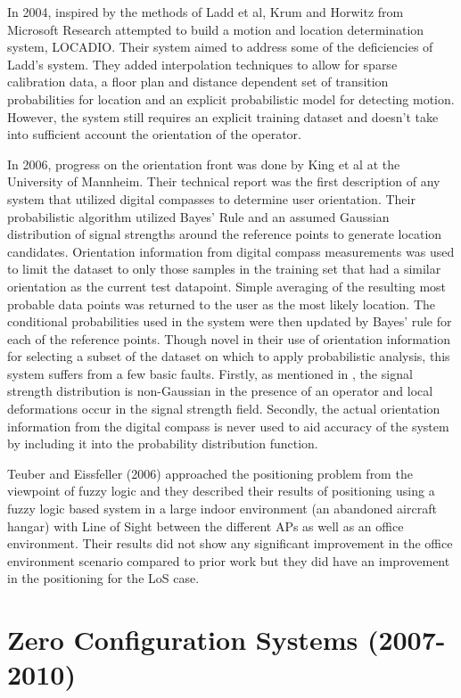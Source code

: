 In 2004, inspired by the methods of Ladd et al, Krum and Horwitz from Microsoft Research attempted to build a motion and location determination system, LOCADIO. Their system aimed to address some of the deficiencies of Ladd’s system. They added interpolation techniques to allow for sparse calibration data, a floor plan and distance dependent set of transition probabilities for location and an explicit probabilistic model for detecting motion. However, the system still requires an explicit training dataset and doesn’t take into sufficient account the orientation of the operator.

In 2006, progress on the orientation front was done by King et al at the University of Mannheim. Their technical report was the first description of any system that utilized digital compasses to determine user orientation. Their probabilistic algorithm utilized Bayes’ Rule and an assumed Gaussian distribution of signal strengths around the reference points to generate location candidates. Orientation information from digital compass measurements was used to limit the dataset to only those samples in the training set that had a similar orientation as the current test datapoint. Simple averaging of the resulting most probable data points was returned to the user as the most likely location. The conditional probabilities used in the system were then updated by Bayes’ rule for each of the reference points. Though novel in their use of orientation information for selecting a subset of the dataset on which to apply probabilistic analysis, this system suffers from a few basic faults. Firstly, as mentioned in , the signal strength distribution is non-Gaussian in the presence of an operator and local deformations occur in the signal strength field. Secondly, the actual orientation information from the digital compass is never used to aid accuracy of the system by including it into the probability distribution function.

Teuber and Eissfeller (2006) approached the positioning problem from the viewpoint of fuzzy logic and they described their results of positioning using a fuzzy logic based system in a large indoor environment (an abandoned aircraft hangar) with Line of Sight between the different APs as well as an office environment. Their results did not show any significant improvement in the office environment scenario compared to prior work but they did have an improvement in the positioning for the LoS case.

\section{Zero Configuration Systems (2007-2010)}

